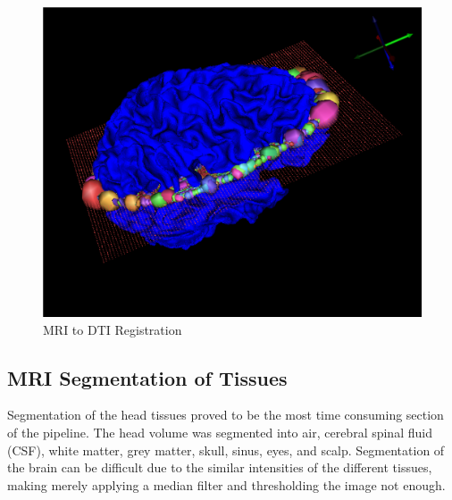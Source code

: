 \begin{figure}[H]
\begin{center}
\includegraphics[width=.75\textwidth]{Figures/DTI_reg}
\caption{MRI to DTI Registration}
\label{fig:dtireg}
\end{center}
\end{figure}

\subsection{MRI Segmentation of Tissues}
\label{sec:Seg}


Segmentation of the head tissues proved to be the most time consuming section of the pipeline. The head volume was segmented into air, cerebral spinal fluid (CSF), white matter, grey matter, skull, sinus, eyes, and scalp. Segmentation of the brain can be difficult due to the similar intensities of the different tissues, making merely applying a median filter and thresholding the image not enough.

